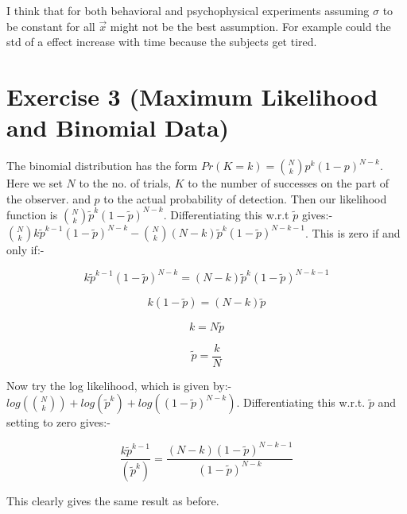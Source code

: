 \documentclass[]{article}
\begin{document}
I think that for both behavioral and psychophysical experiments assuming $\sigma$
to be constant for all $\vec{x}$ might not be the best assumption. For example
could the std of a effect increase with time because the subjects get tired. 




\section{Exercise 3 (Maximum Likelihood and Binomial Data)} %
\label{sg:sec:exercise_3_gain_control}

The binomial distribution has the form $Pr(K=k) = {{N} \choose {k}}p^k (1-p)^{N-k}$. Here we set $N$ to the no. of trials, $K$ to the number of successes on the part of the observer.
and $p$ to the actual probability of detection. Then our likelihood function is ${{N} \choose {k}}\tilde{p}^k (1-\tilde{p})^{N-k}$. Differentiating this w.r.t $\tilde{p}$ gives:-
${{N} \choose {k}}k\tilde{p}^{k-1} (1-\tilde{p})^{N-k} - {{N} \choose {k}}(N-k)\tilde{p}^k (1-\tilde{p})^{N-k-1}$. This is zero if and only if:- 

\begin{equation} 
k\tilde{p}^{k-1} (1-\tilde{p})^{N-k} = (N-k)\tilde{p}^k (1-\tilde{p})^{N-k-1}
\end{equation}

\begin{equation}
k (1-\tilde{p}) = (N-k)\tilde{p}
\end{equation}

\begin{equation}
k = N\tilde{p}
\end{equation}

\begin{equation}
\tilde{p} = \frac{k}{N}
\end{equation}

Now try the log likelihood, which is given by:-  $log({{N} \choose {k}})+log(\tilde{p}^k)+log( (1-\tilde{p})^{N-k})$.
Differentiating this w.r.t. $\tilde{p}$ and setting to zero gives:-

\begin{equation}
\frac{k\tilde{p}^{k-1}}{(\tilde{p}^k)}   =   \frac{(N-k)(1-\tilde{p})^{N-k-1}}{ (1-\tilde{p})^{N-k}} 
\end{equation}

This clearly gives the same result as before.
\end{document}
